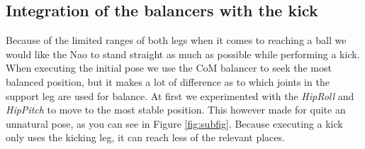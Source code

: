 \documentclass[a4paper]{article}
\begin{document}
\begin{figure}[htbp]
  \centering
  \caption{
         }
  \label{fig:retraction_plot3}
\end{figure}

\subsection{Integration of the balancers with the kick}
Because of the limited ranges of both legs when it comes to reaching a ball we
would like the Nao to stand straight as much as possible while performing a kick. 
When executing the initial pose we use the CoM balancer to seek the most
balanced position, but it makes a lot of difference as to which joints in the
support leg are used for balance. At first we experimented  with the
\emph{HipRoll} and \emph{HipPitch} to move to the most stable position. This
however made for quite an unnatural pose, as you can see in Figure
\ref{fig:subfig}. Because executing a kick only uses the kicking leg, it can
reach less of the relevant places. 
\end{document}
